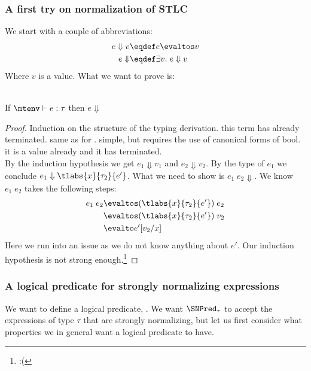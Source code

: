 \subsubsection*{A first try on normalization of STLC}
We start with a couple of abbreviations:
\begin{align*}
  e \Downarrow v & \eqdef e \evaltos v \\
  e \Downarrow   & \eqdef \exists v. \; e \Downarrow v
\end{align*}
Where $v$ is a value.
What we want to prove is:
\begin{strnorm}~\\
  If $\mtenv \vdash e : \tau$ then $e \Downarrow$
\end{strnorm}
\begin{proof}
Induction on the structure of the typing derivation.
 this term has already terminated.
 same as for \true.
 simple, but requires
the use of canonical forms of bool.
 it is a value already and it has terminated.
\case{$ \TApp $} \\
By the induction hypothesis we get $e_1 \Downarrow v_1$ and $e_2 \Downarrow v_2$. By the type of $e_1$ we conclude $e_1 \Downarrow \tlabs{x}{\tau_2}{e'}$. What we need to show is $e_1 \; e_2 \Downarrow$. We know $e_1 \; e_2$ takes the following steps:
\begin{align*}
  e_1 \; e_2 & \evaltos (\tlabs{x}{\tau_2}{e'}) \; e_2 \\
            & \evaltos (\tlabs{x}{\tau_2}{e'}) \; v_2 \\
            & \evalto e'[v_2/x]
\end{align*}
Here we run into an issue as we do not know anything about $e'$. Our induction hypothesis is not strong enough.\footnote{:(}
\end{proof}
\subsubsection*{A logical predicate for strongly normalizing expressions}
We want to define a logical predicate, . We want $\SNPred_\tau$ to accept the expressions of type $\tau$ that are strongly normalizing, but let us first consider what properties we in general want a logical predicate to have.

